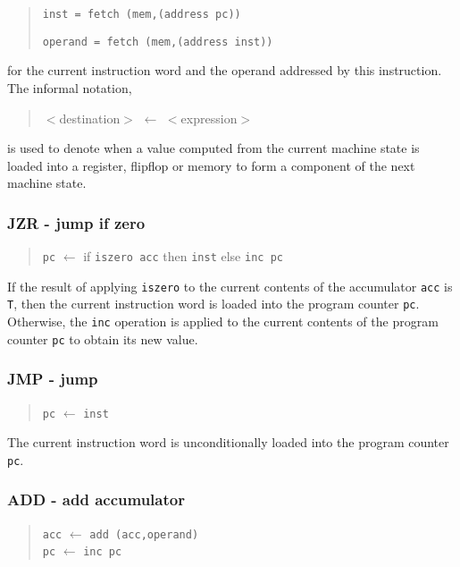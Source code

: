 \begin{quote}
\verb"inst = fetch (mem,(address pc))"

\verb"operand = fetch (mem,(address inst))"
\end{quote}

\noindent
for the current instruction word
and the operand addressed by this instruction.
The informal notation,

\begin{quote}
$<$destination$>$ $\leftarrow$ $<$expression$>$
\end{quote}

\noindent
is used to denote when a value computed from the current machine state
is loaded into a register, flipflop or memory to form a component of the
next machine state.

\subsubsection*{JZR - jump if zero}

\begin{quote}
\verb"pc" $\leftarrow$ if \verb"iszero acc" then \verb"inst" else \verb"inc pc"
\end{quote}

If the result of applying \verb"iszero" to the current contents of the
accumulator \verb"acc" is \verb"T",
then the current instruction word is loaded into the program
counter \verb"pc".
Otherwise, the \verb"inc" operation
is applied to the current contents of the program counter \verb"pc" to
obtain its new value.

\subsubsection*{JMP - jump}

\begin{quote}
\verb"pc" $\leftarrow$ \verb"inst"
\end{quote}

The current instruction word is unconditionally loaded into the program
counter \verb"pc".

\subsubsection*{ADD - add accumulator}

\begin{quote}
\verb"acc" $\leftarrow$ \verb"add (acc,operand)"\\
\verb"pc" $\leftarrow$ \verb"inc pc"
\end{quote}

